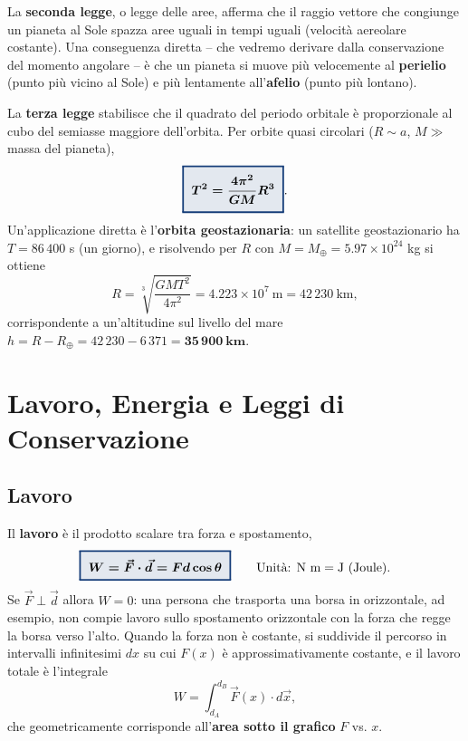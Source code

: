 \documentclass[a4paper,11pt]{article}
\newcommand{\keyeq}[1]{{\setlength{\fboxsep}{6pt}\setlength{\fboxrule}{1.3pt}\fcolorbox{chapblue}{chapblue!12}{\boldmath$\displaystyle #1$}}}
\begin{document}
La \textbf{seconda legge}, o legge delle aree, afferma che il raggio vettore che congiunge un pianeta al Sole spazza aree uguali in tempi uguali (velocità aereolare costante). Una conseguenza diretta -- che vedremo derivare dalla conservazione del momento angolare -- è che un pianeta si muove più velocemente al \textbf{perielio} (punto più vicino al Sole) e più lentamente all'\textbf{afelio} (punto più lontano).

La \textbf{terza legge} stabilisce che il quadrato del periodo orbitale è proporzionale al cubo del semiasse maggiore dell'orbita. Per orbite quasi circolari ($R\sim a$, $M\gg$ massa del pianeta),
\[
\keyeq{T^2 = \frac{4\pi^2}{GM}R^3}.
\]
Un'applicazione diretta è l'\textbf{orbita geostazionaria}: un satellite geostazionario ha $T=86\,400$ s (un giorno), e risolvendo per $R$ con $M=M_\oplus=5.97\times10^{24}$ kg si ottiene
\[
R = \sqrt[3]{\frac{GMT^2}{4\pi^2}} = 4.223\times10^7\ \text{m} = 42\,230\ \text{km},
\]
corrispondente a un'altitudine sul livello del mare $h=R-R_\oplus=42\,230-6\,371=\mathbf{35\,900\ \text{km}}$.

\newpage
\section{Lavoro, Energia e Leggi di Conservazione}

\subsection{Lavoro}

Il \textbf{lavoro} è il prodotto scalare tra forza e spostamento,
\[
\keyeq{W = \vec F \cdot \vec d = Fd\cos\theta} \qquad \text{Unità: N m} = \text{J (Joule)}.
\]
Se $\vec F\perp\vec d$ allora $W=0$: una persona che trasporta una borsa in orizzontale, ad esempio, non compie lavoro sullo spostamento orizzontale con la forza che regge la borsa verso l'alto. Quando la forza non è costante, si suddivide il percorso in intervalli infinitesimi $dx$ su cui $F(x)$ è approssimativamente costante, e il lavoro totale è l'integrale
\[
W = \int_{d_A}^{d_B} \vec F(x)\cdot d\vec x,
\]
che geometricamente corrisponde all'\textbf{area sotto il grafico} $F$ vs. $x$.
\end{document}
